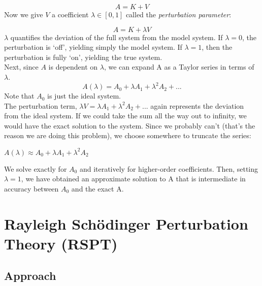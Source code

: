 \documentclass{article}
\newcommand{\vsp}{\vspace{0.2cm}}
\renewcommand{\l}{\ensuremath{\lambda}}
\begin{document}
\begin{equation*}    
   A = K + V   
\end{equation*} 
Now we give $V$ a coefficient $\l \in [0,1]$ called the {\it perturbation parameter}:

\begin{equation}   
   A = K + \l V    
\end{equation} 
$\l$ quantifies the deviation of the full system from the model system. If $\l=0$, the perturbation is `off', yielding simply the model system. If $\l=1$, then the perturbation is fully `on', yielding the true system. \vsp \\
Next, since  $A$ is dependent on $\l$, we can expand A as a Taylor series in terms of $\l$. 
\begin{equation*}  
   A(\l) = A_0 + \l A_1 + \l^2 A_2 + ...   
\end{equation*}
Note that $A_0$ is just the ideal system. \vsp \\
The perturbation term, $\l V = \l A_1 + \l^2 A_2 + ...$ again represents the deviation from the ideal system. If we could take the sum all the way out to infinity, we would have the exact solution to the system. Since we probably can't (that's the reason we are doing this problem), we choose somewhere to truncate the series: 
\begin{center} $A(\l) \approx A_0 + \l A_1+\l^2 A_2$\end{center}
We solve exactly for $A_0$ and iteratively for higher-order coefficients. Then, setting $\l=1$, we have obtained an approximate solution to A that is intermediate in accuracy between $A_0$ and the exact A.
\newpage 



\section{Rayleigh Sch{\"o}dinger Perturbation Theory (RSPT)}

\subsection{Approach}
\end{document}
